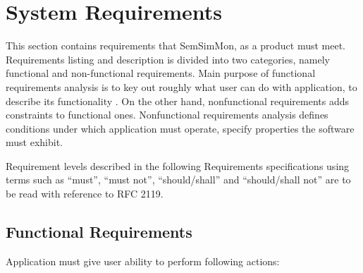 %
 
\section{System Requirements}
\label{sec:SystemRequirements}

This section contains requirements that SemSimMon, as a product must meet. Requirements listing and description is
divided into two categories, namely  functional and non-functional requirements. Main purpose of functional requirements
analysis is to key out roughly what user can do with application, to describe its functionality . On the other hand,
nonfunctional requirements adds constraints to functional ones. Nonfunctional requirements analysis defines
conditions under which application must operate, specify properties the software must exhibit\cite{Windle:SoftReq}.

Requirement levels described in the following Requirements specifications using terms such as ``must'', ``must
not'', ``should/shall'' and ``should/shall not'' are to be read with reference to RFC 2119\cite{rfc:2119}.


\subsection{Functional Requirements}
\label{subsec:FunctionalRequirements}

Application must give user ability to perform following actions:

